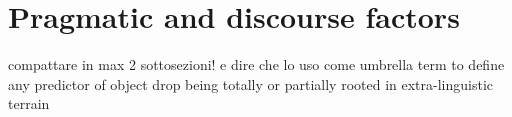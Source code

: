 



\section{Pragmatic and discourse factors} 

compattare in max 2 sottosezioni! e dire che lo uso come umbrella term to define any predictor of object drop being totally or partially rooted in extra-linguistic terrain


